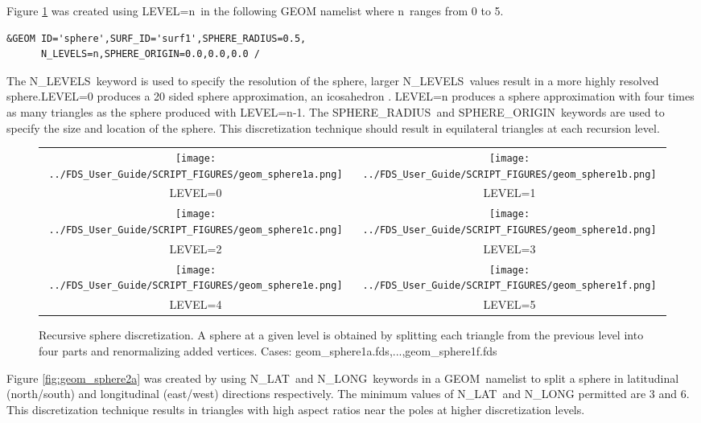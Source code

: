 \documentclass[11pt]{book}
\begin{document}
Figure \ref{fig:geom_sphere} was created using {\ct LEVEL=n}\
in the following {\ct GEOM} namelist
where {\ct n}\ ranges from 0 to 5.
\begin{lstlisting}
&GEOM ID='sphere',SURF_ID='surf1',SPHERE_RADIUS=0.5,
      N_LEVELS=n,SPHERE_ORIGIN=0.0,0.0,0.0 /
\end{lstlisting}
The {\ct N\_LEVELS}\ keyword is used to specify the resolution of the sphere, larger {\ct N\_LEVELS}\ values result in a more highly resolved sphere.{\ct LEVEL=0} produces a 20 sided sphere approximation, an icosahedron . {\ct LEVEL=n} produces a sphere approximation with four times as many triangles as the sphere produced with {\ct LEVEL=n-1}. The {\ct SPHERE\_RADIUS}\ and {\ct SPHERE\_ORIGIN}\ keywords are used to specify the size and location of the sphere.  This discretization technique should result in equilateral triangles at each recursion level.

\begin{figure}
\begin{center}
\begin{tabular}{cc}
 \texttt{[image: ../FDS\_User\_Guide/SCRIPT\_FIGURES/geom\_sphere1a.png]}&
 \texttt{[image: ../FDS\_User\_Guide/SCRIPT\_FIGURES/geom\_sphere1b.png]}\\
 LEVEL=0&LEVEL=1\\
 \texttt{[image: ../FDS\_User\_Guide/SCRIPT\_FIGURES/geom\_sphere1c.png]}&
 \texttt{[image: ../FDS\_User\_Guide/SCRIPT\_FIGURES/geom\_sphere1d.png]}\\
 LEVEL=2&LEVEL=3\\
 \texttt{[image: ../FDS\_User\_Guide/SCRIPT\_FIGURES/geom\_sphere1e.png]}&
 \texttt{[image: ../FDS\_User\_Guide/SCRIPT\_FIGURES/geom\_sphere1f.png]}\\
 LEVEL=4&LEVEL=5\\
  \end{tabular}
\end{center}
 \caption[Recursive sphere discretization]{Recursive sphere discretization.  A sphere at a given level is
 obtained by splitting each triangle from the previous level into four parts and renormalizing added vertices. Cases: {\ct geom\_sphere1a.fds},...,{\ct geom\_sphere1f.fds}}
\label{fig:geom_sphere}
\end{figure}

Figure \ref{fig:geom_sphere2a} was created by using {\ct N\_LAT}\ and {\ct N\_LONG}\ keywords in a {\ct GEOM}\ namelist
to split a sphere in latitudinal (north/south) and longitudinal (east/west) directions respectively. The minimum values of {\ct N\_LAT}\ and {\ct N\_LONG} permitted are 3 and 6.  This discretization technique results in triangles with high aspect ratios near the poles at higher discretization levels.
\end{document}
